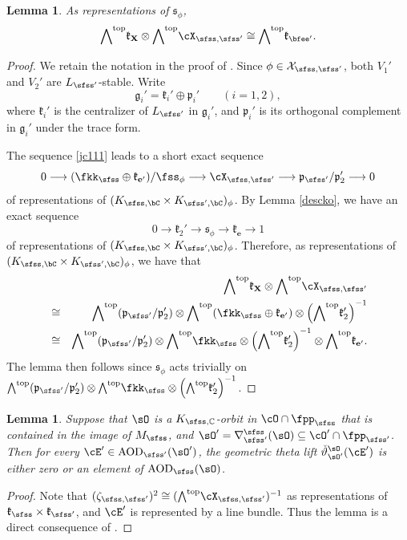 \documentclass[11pt,a4paper]{amsart}
\newcommand{\CX}{{\mathcal {X}}}
\newcommand{\g}{\mathfrak g}
\newcommand{\p}{\mathfrak p}
\newcommand{\X}{\mathbf{X}}
\numberwithin{equation}{section}
\newtheorem{lem}[thm]{Lemma}
\theoremstyle{remark}
\def\subset{\subseteq}
\def\cOp{\cO^{\prime}}
\def\AOD{\mathrm{AOD}}
\begin{document}
\begin{lem}\label{lem:tan}
 As representations of  $\mathfrak s_\phi$,
  \begin{equation}\label{eq:aod}
    \wedgetop \mathfrak k_{\X} \otimes \wedgetop \CXss  \cong \wedgetop \mathfrak k_{\Xp}.
  \end{equation}
\end{lem}
\begin{proof}
  We retain the notation in the proof of . Since $\phi\in \CX_{\sfss, \sfss'}$, both $V_1'$ and $V_2'$ are $L_{\sfss'}$-stable.  Write
  \[
    \g_i'=\mathfrak k_i'\oplus \p_i'\qquad (i=1,2),
  \]
  where $\mathfrak k_i'$ is the centralizer of $L_{\sfss'}$ in $\g_i'$, and $\p_i'$ is its orthogonal complement in $\g_i'$ under the trace form.

   The sequence \eqref{jc111} leads to a short exact sequence
  \[
    0\longrightarrow (\fkks\oplus \mathfrak k_{\mathbf e'})/ \fss_{\ww}
    \longrightarrow \CXss \longrightarrow \p_{\sfss'}/\p_2'  \longrightarrow 0
  \]
  of representations of $(\Ks\times \Ksp)_{\ww}$.
By
Lemma \ref{descko}, we have an exact sequence
\[
  0\rightarrow \mathfrak k_2'\rightarrow \mathfrak s_\phi\rightarrow \mathfrak k_{\mathbf e}\rightarrow 1
\]
of representations of $(\Ks\times \Ksp)_{\ww}$. Therefore, as  representations of $(\Ks\times \Ksp)_{\ww}$, we have that
\begin{eqnarray*}
      &&\wedgetop \mathfrak k_{\X} \otimes \wedgetop \CXss\\
      & \cong & \wedgetop (\p_{\sfss'}/\p_2')  \otimes \wedgetop (\fkks\oplus \mathfrak k_{\mathbf e'}) \otimes
      \left(\wedgetop \mathfrak k_2'\right)^{-1}\\
       & \cong & \wedgetop (\p_{\sfss'}/\p_2')  \otimes  \wedgetop \fkks \otimes
      \left(\wedgetop \mathfrak k_2'\right)^{-1}\otimes \wedgetop  \mathfrak k_{\mathbf e'}. \\
\end{eqnarray*}
The lemma then follows since $\mathfrak s_\phi$ acts trivially on $ \wedgetop (\p_{\sfss'}/\p_2')  \otimes  \wedgetop \fkks \otimes
      \left(\wedgetop \mathfrak k_2'\right)^{-1}$.
      \end{proof}



\begin{lem}\label{lem:aod}
  Suppose that $\sO$ is a $K_{\sfss,\C}$-orbit in $\cO\cap \fpps$ that is contained in the image of $M_\sfss$,  and
  $\sOp = \DDss(\sO)\subset \cOp\cap \fppsp$.
  Then for every $\cE' \in \AOD_{\sfss'}(\sOp)$,
   the geometric theta lift $\dlift_{\sO'}^{\sO}(\cE')$ is either zero or an element of  $\AOD_{\sfss}(\sO)$.
\end{lem}
\begin{proof}
  Note that $(\zeta_{\sfss,\sfss'})^{2} \cong (\wedgetop \CXss)^{-1}$ as representations of $\mathfrak k_\sfss\times \mathfrak k_{\sfss'}$, and $\cE'$ is represented by a line bundle. Thus
   the lemma is a direct consequence of  .
\end{proof}
\end{document}
